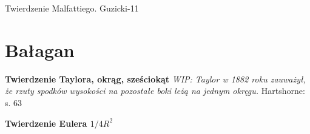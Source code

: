



Twierdzenie Malfattiego.
Guzicki-11

\section{Bałagan}

\textbf{Twierdzenie Taylora, okrąg, sześciokąt}
{
    \emph{WIP: Taylor w 1882 roku zauważył, że rzuty spodków wysokości na pozostałe boki leżą na jednym okręgu.}
	Hartshorne: s. 63
}

\textbf{Twierdzenie Eulera $1/4R^2$}



%